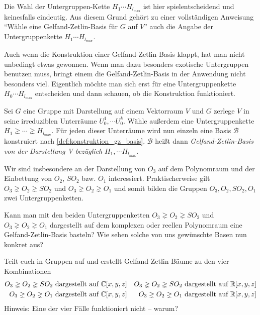 \begin{remark}
		Die Wahl der Untergruppen-Kette $H_1\cdots H_{l_{\text{max}}}$ ist hier spielentscheidend und keinesfalls eindeutig. Aus diesem Grund gehört zu einer vollständigen Anweisung \enquote{Wähle eine Gelfand-Zetlin-Basis für $G$ auf $V$} auch die Angabe der Untergruppenkette $H_1\cdots H_{l_{\text{max}}}$.
\end{remark}
\begin{remark}
	Auch wenn die Konstruktion einer Gelfand-Zetlin-Basis klappt, hat man nicht unbedingt etwas gewonnen. Wenn man dazu besonders exotische Untergruppen benutzen muss, bringt einem die Gelfand-Zetlin-Basis in der Anwendung nicht besonders viel. Eigentlich möchte man sich erst für eine Untergruppenkette $H_0\cdots H_{l_{\text{max}}}$ entscheiden und dann schauen, ob die Konstruktion funktioniert.
\end{remark}
\begin{definition}[$\Gae\jae\el\soft\fae\aaa\en\dae$-$\Zae\jae\tae\el\iii\en$-$\Bae\aaa\sae\aaa$]
	\label{def:gz_basis}
	Sei $G$ eine Gruppe mit Darstellung auf einem Vektorraum $V$ und $G$ zerlege $V$ in seine irreduziblen Unterräume $U^1_0,\cdots U^k_0$. Wähle außerdem eine Untergruppenkette $H_1 \gneq\cdots\gneq H_{l_{\text{max}}}$. Für jeden dieser Unterräume wird nun einzeln eine Basis $\mathcal{B}$ konstruiert nach \ref{def:konstruktion_gz_basis}. $\mathcal{B}$ heißt dann \emph{Gelfand-Zetlin-Basis von der Darstellung V bezüglich} $H_1,\cdots H_{l_{\text{max}}}$. 
\end{definition}

\begin{remark}
	Wir sind insbesondere an der Darstellung von $O_3$ auf dem Polynomraum und der Einbettung von $O_2$, $SO_2$ bzw. $O_1$ interessiert. Praktischerweise gilt $O_3\gneq O_2\gneq SO_2$ und  $O_3\gneq O_2\gneq O_1$ und somit bilden die Gruppen $O_3, O_2, SO_2, O_1$ zwei Untergruppenketten.
\end{remark}

\begin{centralquestion}[Fortsetzung]\label{cq:fortsetzung}
	Kann man mit den beiden Untergruppenketten $O_3\gneq O_2\gneq SO_2$ und  $O_3\gneq O_2\gneq O_1$ dargestellt auf dem komplexen oder reellen Polynomraum eine Gelfand-Zetlin-Basis basteln? Wie sehen solche von uns gewünschte Basen nun konkret aus? 
	
	Teilt euch in Gruppen auf und erstellt Gelfand-Zetlin-Bäume zu den vier Kombinationen
	\begin{align*}
		O_3\gneq O_2\gneq SO_2 \text{ dargestellt auf }& \mathbb{C}[x,y,z] & O_3\gneq O_2\gneq SO_2 \text{ dargestellt auf }& \mathbb{R}[x,y,z] \\
		O_3\gneq O_2\gneq O_1 \text{ dargestellt auf }& \mathbb{C}[x,y,z] & O_3\gneq O_2\gneq O_1 \text{ dargestellt auf }& \mathbb{R}[x,y,z] 
	\end{align*}
	Hinweis: Eine der vier Fälle funktioniert nicht -- warum?
\end{centralquestion}

